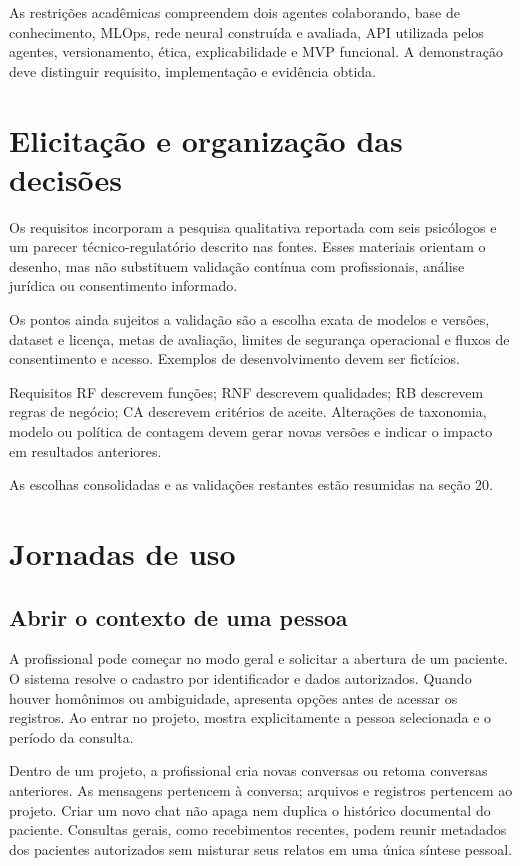 \documentclass[11pt,a4paper]{article}
\begin{document}
As restrições acadêmicas compreendem dois agentes colaborando, base de conhecimento, MLOps, rede neural construída e avaliada, API utilizada pelos agentes, versionamento, ética, explicabilidade e MVP funcional. A demonstração deve distinguir requisito, implementação e evidência obtida.

\section{Elicitação e organização das decisões}
Os requisitos incorporam a pesquisa qualitativa reportada com seis psicólogos e um parecer técnico-regulatório descrito nas fontes. Esses materiais orientam o desenho, mas não substituem validação contínua com profissionais, análise jurídica ou consentimento informado.

Os pontos ainda sujeitos a validação são a escolha exata de modelos e versões, dataset e licença, metas de avaliação, limites de segurança operacional e fluxos de consentimento e acesso. Exemplos de desenvolvimento devem ser fictícios.

Requisitos RF descrevem funções; RNF descrevem qualidades; RB descrevem regras de negócio; CA descrevem critérios de aceite. Alterações de taxonomia, modelo ou política de contagem devem gerar novas versões e indicar o impacto em resultados anteriores.

As escolhas consolidadas e as validações restantes estão resumidas na seção 20.

\section{Jornadas de uso}
\subsection{Abrir o contexto de uma pessoa}
A profissional pode começar no modo geral e solicitar a abertura de um paciente. O sistema resolve o cadastro por identificador e dados autorizados. Quando houver homônimos ou ambiguidade, apresenta opções antes de acessar os registros. Ao entrar no projeto, mostra explicitamente a pessoa selecionada e o período da consulta.

Dentro de um projeto, a profissional cria novas conversas ou retoma conversas anteriores. As mensagens pertencem à conversa; arquivos e registros pertencem ao projeto. Criar um novo chat não apaga nem duplica o histórico documental do paciente. Consultas gerais, como recebimentos recentes, podem reunir metadados dos pacientes autorizados sem misturar seus relatos em uma única síntese pessoal.
\end{document}
